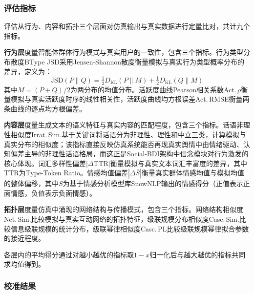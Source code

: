 \documentclass[a4paper,fleqn]{cas-dc}
\begin{document}
\subsubsection{评估指标}

评估从行为、内容和拓扑三个层面对仿真输出与真实数据进行定量比对，共计九个指标。

\textbf{行为层}度量智能体群体行为模式与真实用户的一致性，包含三个指标。行为类型分布散度BType JSD采用Jensen-Shannon散度衡量模拟与真实行为类型概率分布的差异，定义为：
\begin{equation}
\text{JSD}(P \| Q) = \tfrac{1}{2} D_{\text{KL}}(P \| M) + \tfrac{1}{2} D_{\text{KL}}(Q \| M)
\end{equation}
其中$M = (P + Q)/2$为两分布的均值分布。活跃度曲线Pearson相关系数Act.\,$\rho$衡量模拟与真实活跃度时序的线性相关性，活跃度曲线均方根误差Act.\,RMSE衡量两条曲线的逐点均方根偏差。

\textbf{内容层}度量生成文本的语义特征与真实内容的匹配程度，包含三个指标。话语非理性相似度Irrat.\,Sim.基于关键词将话语分为非理性、理性和中立三类，计算模拟与真实分布的相似度；该指标直接反映仿真系统能否再现真实舆情中由情绪驱动、认知偏差主导的非理性话语格局，而这正是Social-BDI架构中信念模块对行为激发的核心体现。词汇多样性偏差$|\Delta\text{TTR}|$衡量模拟与真实文本词汇丰富度的差异，其中TTR为Type-Token Ratio。情感均值偏差$|\Delta\bar{S}|$衡量真实群体情感均值与模拟均值的整体偏移，其中$S$为基于情感分析模型库SnowNLP输出的情感得分（正值表示正面情感，负值表示负面情感）。

\textbf{拓扑层}度量仿真中涌现的网络结构与传播模式，包含三个指标。网络结构相似度Net.\,Sim.比较模拟与真实互动网络的拓扑特征，级联规模分布相似度Casc.\,Sim.比较信息级联规模的统计分布，级联幂律相似度Casc.\,PL比较级联规模幂律拟合参数的接近程度。

各层内的平均得分通过对越小越优的指标取$1{-}x$归一化后与越大越优的指标共同求均值得到。

\subsubsection{校准结果}
\end{document}
